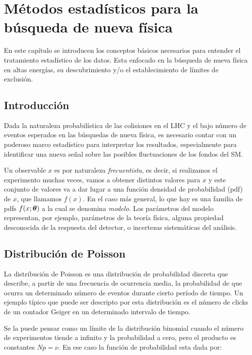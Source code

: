 \chapter{Métodos estadísticos para la búsqueda de nueva física}

En este capítulo se introducen los conceptos básicos necesarios para entender el
tratamiento estadístico de los datos. Esta enfocado en la búsqueda de nueva
física en altas energías, su descubrimiento y/o el establecimiento de límites de
exclusión.


\section{Introducción} %

Dada la naturaleza probabilística de las colisiones en el LHC y el bajo número
de eventos esperados en las búsquedas de nueva física, es necesario contar con
un poderoso marco estadístico para interpretar los resultados, especialmente
para identificar una nueva señal sobre las posibles fluctuaciones de los fondos
del SM.

Un observable $x$ es por naturaleza \emph{frecuentista}, es decir, si realizamos
el experimento muchas veces, vamos a obtener distintos valores para $x$ y este
conjunto de valores va a dar lugar a una función densidad de probabilidad (pdf)
de $x$, que llamamos $f(x)$. En el caso más general, lo que hay es una familia
de pdfs $f(x;\bm{\theta})$ a la cual se denomina \emph{modelo}. Los parámetros del
modelo representan, por ejemplo, parámetros de la teoría física, alguna
propiedad desconocida de la respuesta del detector, o incertezas sistemáticas
del análisis.


\section{Distribución de Poisson}

La distribución de Poisson es una distribución de probabilidad discreta que
describe, a partir de una frecuencia de ocurrencia media, la probabilidad de que
ocurra un determinado número de eventos durante cierto período de tiempo. Un
ejemplo típico que puede ser descripto por esta distribución es el número de
clicks de un contador Geiger en un determinado intervalo de tiempo.

Se la puede pensar como un límite de la distribución binomial cuando el número
de experimentos tiende a infinito y la probabilidad a cero, pero el producto es
constantes $Np = \nu$. En ese caso la función de probabilidad esta dada por:


